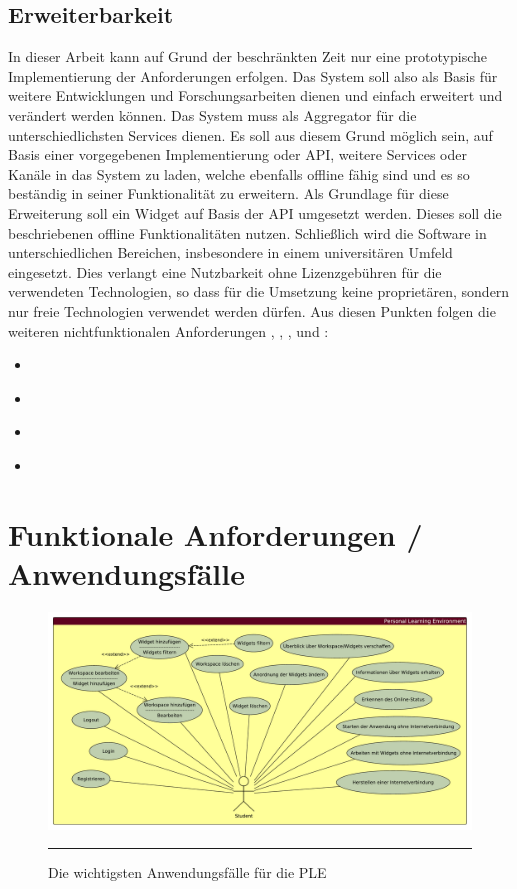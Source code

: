 \subsection{Erweiterbarkeit}
In dieser Arbeit kann auf Grund der beschränkten Zeit nur eine prototypische Implementierung der Anforderungen erfolgen. Das System soll also als Basis für weitere Entwicklungen und Forschungsarbeiten dienen und einfach erweitert und verändert werden können. Das System muss als Aggregator für die unterschiedlichsten Services dienen. Es soll aus diesem Grund möglich sein, auf Basis einer vorgegebenen Implementierung oder API, weitere Services oder Kanäle in das System zu laden, welche ebenfalls offline fähig sind und es so beständig in seiner Funktionalität zu erweitern. Als Grundlage für diese Erweiterung soll ein Widget auf Basis der API umgesetzt werden. Dieses soll die beschriebenen offline Funktionalitäten nutzen. Schließlich wird die Software in unterschiedlichen Bereichen, insbesondere in einem universitären Umfeld eingesetzt. Dies verlangt eine Nutzbarkeit ohne Lizenzgebühren für die verwendeten Technologien, so dass für die Umsetzung keine proprietären, sondern nur freie Technologien verwendet werden dürfen. Aus diesen Punkten folgen die weiteren nichtfunktionalen Anforderungen , , , und :
\begin{itemize}
 \item \requirement{\requirementNewWidgetsWithApi}\label{requirementNewWidgetsWithApi}
 \item \requirement{\requirementExampleWidget}\label{requirementExampleWidget}
 \item \requirement{\requirementExtensibility}\label{requirementExtensibility}
 \item \requirement{\requirementOpenSource}\label{requirementOpenSource}
\end{itemize}

\section{Funktionale Anforderungen / Anwendungsfälle}\label{section:anwendungsfaelle}
\begin{figure}[hb]
  \centering
  \includegraphics[width=\textwidth,height=\textheight,keepaspectratio]{./Figures/anwendungsfaelle_quer.pdf}
    \rule{35em}{0.5pt}
  \caption[Anwendungsfälle der PLE]{Die wichtigsten Anwendungsfälle für die PLE}
  \label{fig:anwendungsfaelle}
\end{figure}

